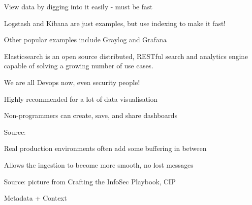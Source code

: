 \documentclass[Screen16to9,17pt]{foils}
\begin{document}


\begin{list1}
\item View data by digging into it easily - must be fast
\item Logstash and Kibana are just examples, but use indexing to make it fast!
\item Other popular examples include Graylog and Grafana
\end{list1}



Elasticsearch is an open source distributed, RESTful search and analytics engine capable of solving a growing number of use cases.


\vskip 1cm
\centerline{We are all Devops now, even security people!}




\centerline{Highly recommended for a lot of data visualisation}

Non-programmers can create, save, and share dashboards

Source:



\begin{list2}
\item Real production environments often add some buffering in between
\item Allows the ingestion to become more smooth, no lost messages
\end{list2}




Source: picture from Crafting the InfoSec Playbook, CIP

Metadata + Context



\end{document}
